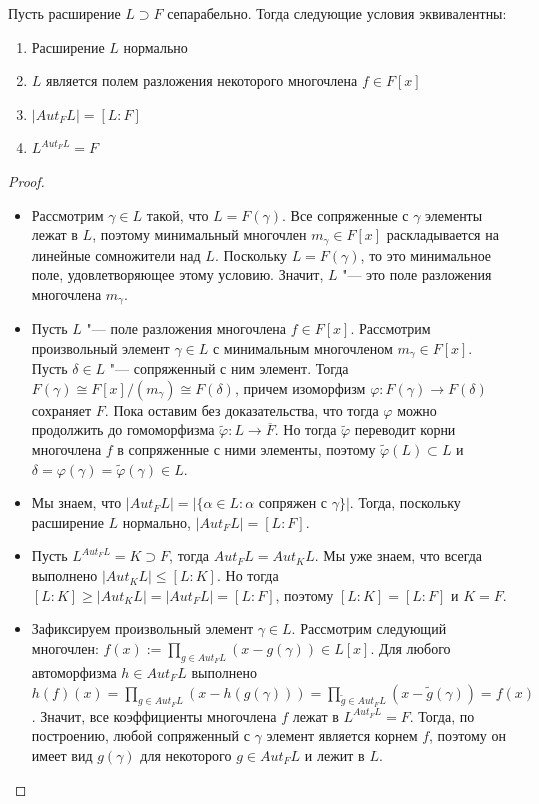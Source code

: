 \begin{theorem}
	Пусть расширение $L \supset F$ сепарабельно. Тогда следующие условия эквивалентны:
	\begin{enumerate}
		\item Расширение $L$ нормально
		\item $L$ является полем разложения некоторого многочлена $f \in F[x]$
		\item $|Aut_F{L}| = [L : F]$
		\item $L^{Aut_F{L}} = F$
	\end{enumerate}
\end{theorem}

\begin{proof}~
	\begin{itemize}
		\item[$1 \Rightarrow 2$] Рассмотрим $\gamma \in L$ такой, что $L = F(\gamma)$. Все сопряженные с $\gamma$ элементы лежат в $L$, поэтому минимальный многочлен $m_\gamma \in F[x]$ раскладывается на линейные сомножители над $L$. Поскольку $L = F(\gamma)$, то это минимальное поле, удовлетворяющее этому условию. Значит, $L$ "--- это поле разложения многочлена $m_\gamma$.
		\item[$2 \Rightarrow 1$]Пусть $L$ "--- поле разложения многочлена $f \in F[x]$. Рассмотрим произвольный элемент $\gamma \in L$ с минимальным многочленом $m_\gamma \in F[x]$. Пусть $\delta \in L$ "--- сопряженный с ним элемент. Тогда $F(\gamma) \cong F[x]/(m_\gamma) \cong F(\delta)$, причем изоморфизм $\varphi: F(\gamma) \to F(\delta)$ сохраняет $F$. Пока оставим без доказательства, что тогда $\varphi$ можно продолжить до гомоморфизма $\widetilde{\varphi}: L \to \overline{F}$. Но тогда $\widetilde{\varphi}$ переводит корни многочлена $f$ в сопряженные с ними элементы, поэтому $\widetilde{\varphi}(L) \subset L$ и $\delta = \varphi(\gamma) = \widetilde{\varphi}(\gamma) \in L$.
		\item[$1 \Rightarrow 3$] Мы знаем, что $|Aut_{F}L| = |\{\alpha \in L : \alpha\text{ сопряжен с }\gamma\}|$. Тогда, поскольку расширение $L$ нормально, $|Aut_{F}{L}| = [L : F]$.
		\item[$3 \Rightarrow 4$] Пусть $L^{Aut_FL} = K \supset F$, тогда $Aut_FL = Aut_KL$. Мы уже знаем, что всегда выполнено $|Aut_KL| \le [L : K]$. Но тогда $[L : K] \ge |Aut_KL| = |Aut_FL| = [L : F]$, поэтому $[L : K] = [L : F]$ и $K = F$.
		\item[$4 \Rightarrow 1$] Зафиксируем произвольный элемент $\gamma \in L$. Рассмотрим следующий многочлен: $f(x) := \prod_{g \in Aut_FL}(x - g(\gamma)) \in L[x]$. Для любого автоморфизма $h \in Aut_FL$ выполнено $h(f)(x) = \prod_{g \in Aut_FL}(x - h(g(\gamma))) = \prod_{\widetilde{g} \in Aut_FL}(x - \widetilde{g}(\gamma)) = f(x)$. Значит, все коэффициенты многочлена $f$ лежат в $L^{Aut_FL} = F$. Тогда, по построению, любой сопряженный с $\gamma$ элемент является корнем $f$, поэтому он имеет вид $g(\gamma)$ для некоторого $g \in Aut_FL$ и лежит в $L$.\qedhere
	\end{itemize}
\end{proof}

